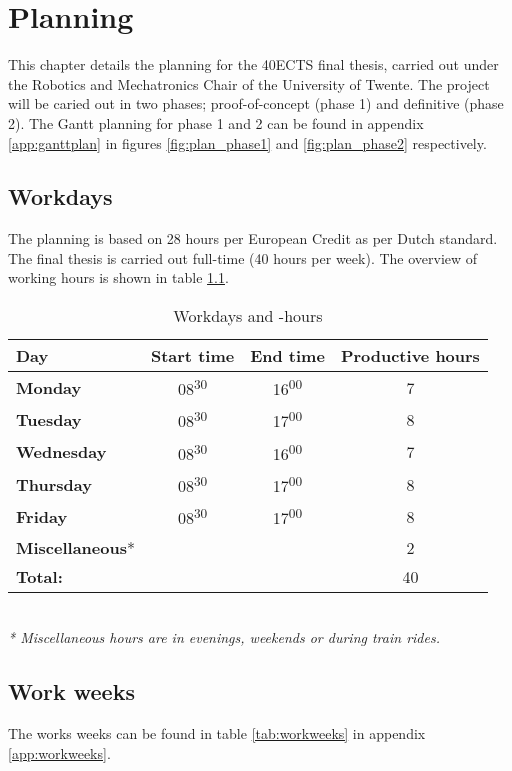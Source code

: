 \chapter{Planning}
\label{ch:Planning}

This chapter details the planning for the 40\ac{ECTS} final thesis, carried out under the Robotics and Mechatronics Chair of the University of Twente. The project will be caried out in two phases; proof-of-concept (phase 1) and definitive (phase 2). The Gantt planning for phase 1 and 2 can be found in appendix \ref{app:ganttplan} in figures \ref{fig:plan_phase1} and \ref{fig:plan_phase2} respectively.
\section{Workdays}
The planning is based on 28 hours per European Credit as per Dutch standard. The final thesis is carried out full-time (40 hours per week). The overview of working hours is shown in table \ref{tab:workdays}.
\begin{table} [h!]
	\begin{tabular}{l|ccc}
		\textbf{Day} 	&	Start time 		&	End time	&	Productive hours \\
		\hline
		\textbf{Monday} 		&	08\textsuperscript{30}	&	16\textsuperscript{00}	& 7 \\
		\rowcolor{Gray}
		\textbf{Tuesday} 	&	08\textsuperscript{30} 	&	17\textsuperscript{00}	& 8 \\
		\textbf{Wednesday} 	&	08\textsuperscript{30}	&	16\textsuperscript{00}	& 7 \\
		\rowcolor{Gray}
		\textbf{Thursday}	&	08\textsuperscript{30}	&	17\textsuperscript{00}	& 8 \\
		\textbf{Friday}		&	08\textsuperscript{30}	&	17\textsuperscript{00}	& 8 \\
		\rowcolor{Gray}
		\textbf{Miscellaneous}* & 		& 			& 2 \\
		\hline
		\textbf{Total:} 	&			&			& 40\\
	\end{tabular} \\
	\textit{* Miscellaneous hours are in evenings, weekends or during train rides.}
	\caption{Workdays and -hours}
	\label{tab:workdays}
\end{table}

\section{Work weeks}
The works weeks can be found in table \ref{tab:workweeks} in appendix \ref{app:workweeks}.

